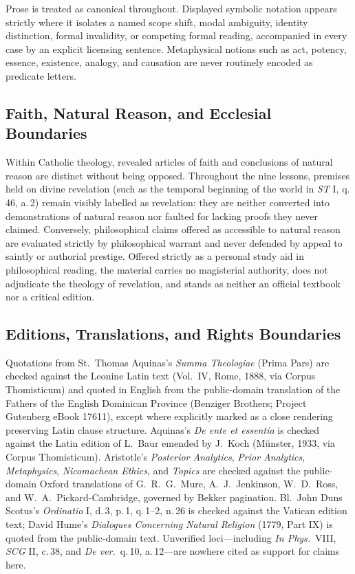 Prose is treated as canonical throughout. Displayed symbolic notation appears strictly where it isolates a named scope shift, modal ambiguity, identity distinction, formal invalidity, or competing formal reading, accompanied in every case by an explicit licensing sentence. Metaphysical notions such as act, potency, essence, existence, analogy, and causation are never routinely encoded as predicate letters.

\subsection*{Faith, Natural Reason, and Ecclesial Boundaries}

Within Catholic theology, revealed articles of faith and conclusions of natural reason are distinct without being opposed. Throughout the nine lessons, premises held on divine revelation (such as the temporal beginning of the world in \emph{ST} I, q.\,46, a.\,2) remain visibly labelled as revelation: they are neither converted into demonstrations of natural reason nor faulted for lacking proofs they never claimed. Conversely, philosophical claims offered as accessible to natural reason are evaluated strictly by philosophical warrant and never defended by appeal to saintly or authorial prestige. Offered strictly as a personal study aid in philosophical reading, the material carries no magisterial authority, does not adjudicate the theology of revelation, and stands as neither an official textbook nor a critical edition.

\subsection*{Editions, Translations, and Rights Boundaries}

Quotations from St.\ Thomas Aquinas's \emph{Summa Theologiae} (Prima Pars) are checked against the Leonine Latin text (Vol.\ IV, Rome, 1888, via Corpus Thomisticum) and quoted in English from the public-domain translation of the Fathers of the English Dominican Province (Benziger Brothers; Project Gutenberg eBook 17611), except where explicitly marked as a close rendering preserving Latin clause structure. Aquinas's \emph{De ente et essentia} is checked against the Latin edition of L.\ Baur emended by J.\ Koch (M\"unster, 1933, via Corpus Thomisticum). Aristotle's \emph{Posterior Analytics}, \emph{Prior Analytics}, \emph{Metaphysics}, \emph{Nicomachean Ethics}, and \emph{Topics} are checked against the public-domain Oxford translations of G.\ R.\ G.\ Mure, A.\ J.\ Jenkinson, W.\ D.\ Ross, and W.\ A.\ Pickard-Cambridge, governed by Bekker pagination. Bl.\ John Duns Scotus's \emph{Ordinatio} I, d.\,3, p.\,1, q.\,1--2, n.\,26 is checked against the Vatican edition text; David Hume's \emph{Dialogues Concerning Natural Religion} (1779, Part IX) is quoted from the public-domain text. Unverified loci---including \emph{In Phys.}\ VIII, \emph{SCG} II, c.\,38, and \emph{De ver.}\ q.\,10, a.\,12---are nowhere cited as support for claims here.

